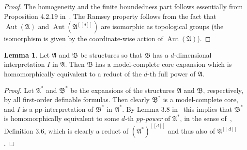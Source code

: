 \documentclass{amsart}
\theoremstyle{definition}
\newtheorem{lemma}[theorem]{Lemma}
\theoremstyle{remark}
\numberwithin{equation}{section}
\newcommand{\aut}{\operatorname{Aut}}
\newcommand{\fa}{\mathfrak{A}}
\newcommand{\fb}{\mathfrak{B}}
\begin{document}

\begin{proof}
	The homogeneity and the finite boundedness part follows essentially from Proposition 4.2.19 in~\cite{bodirsky2021complexity}. The Ramsey property follows from the fact that $\aut(\fa)$ and $\aut(\fa^{[[d]]})$ are isomorphic as topological groups (the isomorphism is given by the coordinate-wise action of $\aut(\fa)$).
\end{proof}

\begin{lemma}\label{reduct_mc_core}
    Let $\fa$ and $\fb$ be structures so that $\fb$ has a $d$-dimensional interpretation $I$ in $\fa$. Then $\fb$ has a model-complete core expansion which is homomorphically equivalent to a reduct of the $d$-th full power of $\fa$.
\end{lemma}

\begin{proof}
	Let $\fa^*$ and $\fb^*$ be the expansions of the structures $\fa$ and $\fb$, respectively, by all first-order definable formulas. Then clearly $\fb^*$ is a model-complete core, and $I$ is a pp-interpretation of $\fb^*$ in $\fa^*$. By Lemma 3.8 in~\cite{wonderland} this implies that $\fb^*$ is homomorphically equivalent to some $d$-th \emph{pp-power} of $\fa^*$, in the sense of~\cite{wonderland}, Definition 3.6, 
    which is clearly a reduct of $(\fa^*)^{[[d]]}$ and thus also of $\fa^{[[d]]}$. 
\end{proof}
\end{document}
